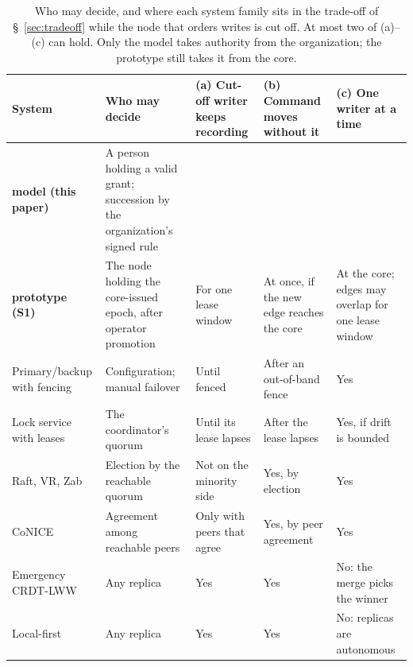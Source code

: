 \begin{table}[t]
\centering
\caption{Who may decide, and where each system family sits in the trade-off of
\S~\ref{sec:tradeoff} while the node that orders writes is cut off. At most two of (a)--(c)
can hold. Only the \systemname{} model takes authority from the organization; the
\systemname{} prototype still takes it from the core.}
\label{tab:related-work}
\scriptsize
\setlength{\tabcolsep}{3pt}
\begin{tabularx}{\textwidth}{@{}>{\raggedright\arraybackslash}p{}>{\raggedright\arraybackslash}p{}>{\raggedright\arraybackslash}p{}>{\raggedright\arraybackslash}p{}>{\raggedright\arraybackslash}X@{}}
\toprule
\textbf{System} & \textbf{Who may decide} & \textbf{(a) Cut-off writer keeps recording} & \textbf{(b) Command moves without it} & \textbf{(c) One writer at a time} \\
\midrule
\textbf{\systemname{} model (this paper)} & A person holding a valid grant; succession by the organization's signed rule & \multicolumn{3}{l}{Chosen by the succession policy (Table~\ref{tab:policies})} \\
\addlinespace
\textbf{\systemname{} prototype (S1)} & The node holding the core-issued epoch, after operator promotion & For one lease window & At once, if the new edge reaches the core & At the core; edges may overlap for one lease window \\
\addlinespace
Primary/backup with fencing~\cite{kleppmann2017ddia} & Configuration; manual failover & Until fenced & After an out-of-band fence & Yes \\
\addlinespace
Lock service with leases~\cite{burrows2006chubby,hunt2010zookeeper} & The coordinator's quorum & Until its lease lapses & After the lease lapses & Yes, if drift is bounded \\
\addlinespace
Raft, VR, Zab~\cite{ongaro2014raft,oki1988viewstamped,junqueira2011zab} & Election by the reachable quorum & Not on the minority side & Yes, by election & Yes \\
\addlinespace
CoNICE~\cite{jahanian2022conice} & Agreement among reachable peers & Only with peers that agree & Yes, by peer agreement & Yes \\
\addlinespace
Emergency CRDT-LWW~\cite{hanssen2025emergency} & Any replica & Yes & Yes & No: the merge picks the winner \\
\addlinespace
Local-first~\cite{kleppmann2019localfirst} & Any replica & Yes & Yes & No: replicas are autonomous \\
\bottomrule
\end{tabularx}
\end{table}

